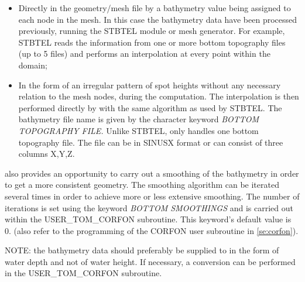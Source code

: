 \begin{itemize}
\item  Directly in the geometry/mesh file by a bathymetry value being assigned to each
  node in the mesh. In this case the bathymetry data have been processed previously,
  running the STBTEL module or mesh generator. For example, STBTEL reads the information
  from one or more bottom topography files (up to 5 files) and performs an interpolation
  at every point within the domain;

\item  In the form of an irregular pattern of spot heights without any necessary
  relation to the mesh nodes, during the \tomawac computation. The interpolation is
  then performed directly by \tomawac with the same algorithm as used by STBTEL. The
  bathymetry file name is given by the character keyword \textit{BOTTOM TOPOGRAPHY
    FILE. }Unlike STBTEL, \tomawac only handles one bottom topography file. The file
  can be in SINUSX format or can consist of three columns X,Y,Z.
\end{itemize}

\tomawac also provides an opportunity to carry out a smoothing of the bathymetry in
order to get a more consistent geometry. The smoothing algorithm can be iterated several
times in order to achieve more or less extensive smoothing. The number of iterations
is set using the keyword \textit{BOTTOM SMOOTHINGS} and is carried out within the
USER\_TOM\_CORFON subroutine. This keyword's default value is 0. (also refer to the
programming of the CORFON user subroutine in \ref{se:corfon}).

NOTE: the bathymetry data should preferably be supplied to \tomawac in the form of
water depth and not of water height. If necessary, a conversion can be performed in
the USER\_TOM\_CORFON subroutine.


